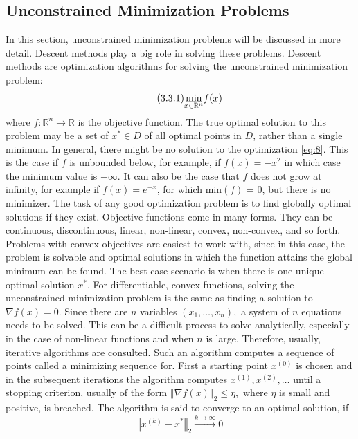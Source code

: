 \subsection{Unconstrained Minimization Problems}
In this section, unconstrained minimization problems will be discussed in more detail. Descent methods play a big role in solving these problems. Descent methods are optimization algorithms for solving the unconstrained minimization problem: 
\begin{equation*}\label{eq:8}\tag{3.3.1}
\underset{x\in\mathbb{R}^{n}}{\min}f(x)\\ 
\end{equation*}
where $f: \mathbb{R}^{n} \longrightarrow \mathbb{R}$ is the objective function. The true optimal solution to this problem may be a set of $x^{*} \in D$ of all optimal points in $D$, rather than a single minimum. In general, there might be no solution to the optimization \eqref{eq:8}. This is the case if $f$ is unbounded below, for example, if $f(x) = -x^{2}$ in which case the minimum value is $-\infty.$ It can also be the case that $f$ does not grow at infinity, for example if $f(x) = e^{-x}$, for which min$(f)$ = 0, but there is no minimizer. The task of any good optimization problem is to find globally optimal solutions if they exist. Objective functions come in many forms. They can be continuous, discontinuous, linear, non-linear, convex, non-convex, and so forth. Problems with convex objectives are easiest to work with, since in this case, the problem is solvable and optimal solutions in which the function attains the global minimum can be found. The best case scenario is when there is one unique optimal solution $x^{*}$. For differentiable, convex functions, solving the unconstrained minimization problem is the same as finding a solution to $\nabla f(x)=0.$ Since there are $n$ variables $(x_{1},\ldots,x_{n}),$ a system of $n$ equations needs to be solved. This can be a difficult process to solve analytically, especially in the case of non-linear functions and when $n$ is large. Therefore, usually, iterative algorithms are consulted. Such an algorithm computes a sequence of points called a minimizing sequence for. First a starting point $x^{(0)}$ is chosen and in the subsequent iterations the algorithm computes $x^{(1)}, x^{(2)},\ldots$ until a stopping criterion, usually of the form $\left\Vert \nabla f(x)\right\Vert_{2}\leq\eta,$ where $\eta$ is small and positive, is breached. The algorithm is said to converge to an optimal solution, if 
\begin{equation*}\tag{3.3.2}
\left\Vert x^{(k)}- x^{*}\right\Vert_{2}\xrightarrow{k\rightarrow\infty} 0
\end{equation*}
